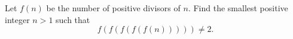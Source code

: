 Let $f(n)$ be the number of positive divisors of $n$. Find the smallest positive integer $n>1$ such that
\[f(f(f(f(f(n)))))\ne2.\]
